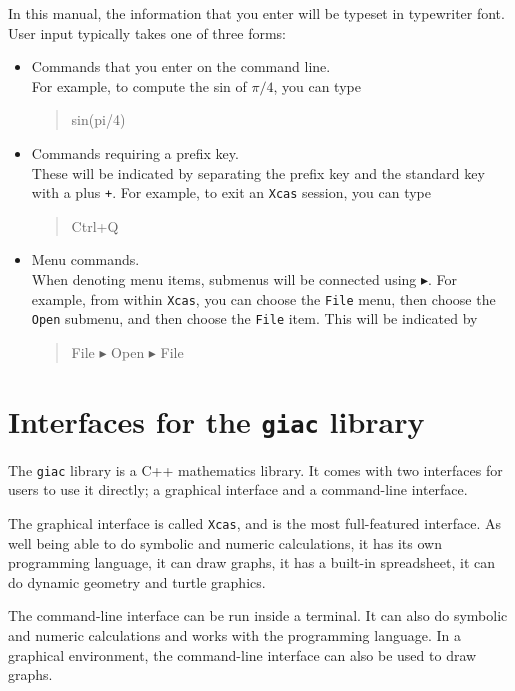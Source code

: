 \documentclass[a4paper,11pt]{book}
\newenvironment{giaccmd}
{\begin{quote}\ttfamily}
{\end{quote}}
\begin{document}
In this manual, the information that you enter will be typeset in
typewriter font.  User input typically takes one of three forms:
\begin{itemize}
\item Commands that you enter on the command line.\\
For example, to compute the sin of $\pi/4$, you can type
\begin{giaccmd}
  sin(pi/4)
\end{giaccmd}

\item Commands requiring a prefix key.\\
These will be indicated by separating
the prefix key and the standard key with a plus \texttt{+}.  For
example, to exit an \texttt{Xcas} session, you can type
\begin{giaccmd}
  Ctrl+Q
\end{giaccmd}

\item Menu commands.\\
When denoting menu items, submenus will be connected using
$\blacktriangleright$.  For example, from within \texttt{Xcas}, you
can choose the \texttt{File} menu, then choose the \texttt{Open}
submenu, and then choose the \texttt{File} item.  This will be
indicated by
\begin{giaccmd}
  File $\blacktriangleright$ Open $\blacktriangleright$ File
\end{giaccmd}
\end{itemize}

\section{Interfaces for the \texttt{giac} library}

The \texttt{giac} library is a C++ mathematics library.  
It comes with two interfaces for users to use it directly; a graphical
interface and a command-line interface.

The graphical interface is called \texttt{Xcas}, and is the most
full-featured interface.  As well being able to do symbolic and numeric
calculations, it has its own programming language, it can draw graphs,
it has a built-in spreadsheet, it can do dynamic geometry
and turtle graphics.

The command-line interface can be run inside a terminal.  It can also
do symbolic and numeric calculations and works with the programming
language.  In a graphical environment, the command-line interface can
also be used to draw graphs.
\end{document}
